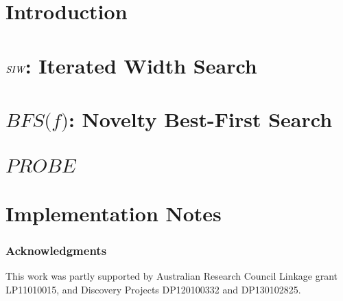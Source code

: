 \documentclass[letterpaper]{article}
\begin{document}
\section{Introduction}


\section{${\textit{SIW}}$: Iterated Width Search}


\section{$\textit{BFS(f)}$: Novelty Best-First Search}


\section{$\textit{PROBE}$}


\section{Implementation Notes}





\subsubsection{Acknowledgments}
This work was partly supported by Australian Research Council Linkage grant LP11010015, and Discovery Projects DP120100332 and DP130102825.




\end{document}
